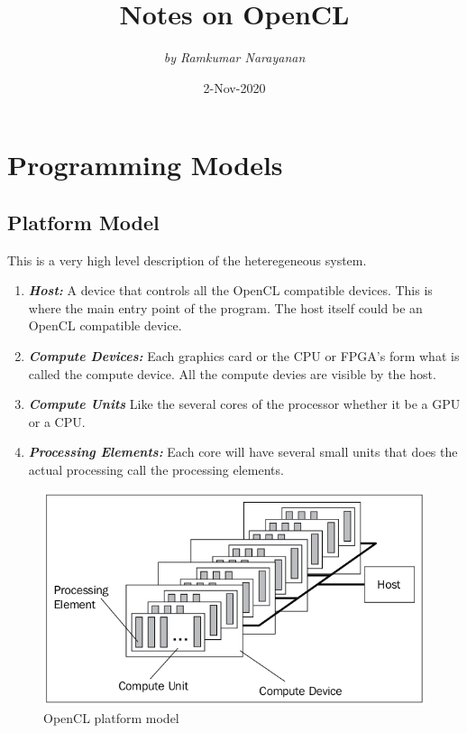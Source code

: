 \documentclass[10pt]{article}
\begin{document}
 
\title{\Huge \bsifamily Notes on OpenCL}
\author{\textit{by Ramkumar Narayanan}}
\date{}
\maketitle 
\tableofcontents
\newpage

{\color{red} \date{2-Nov-2020}}
\section{Programming Models}
\subsection{Platform Model}
This is a very high level description of the heteregeneous system. 
\begin{enumerate}
	\item \textbf{\textit{Host:}} A device that controls all the OpenCL compatible devices. This is where the main entry point of the program. The host itself could be an OpenCL compatible device.
	\item \textbf{\textit{Compute Devices:}} Each graphics card or the CPU or FPGA's form what is called the compute device. All the compute devies are visible by the host.
	\item \textbf{\textit{Compute Units}} Like the several cores of the processor whether it be a GPU or a CPU. 
	\item \textbf{\textit{Processing Elements:}} Each core will have several small units that does the actual processing call the processing elements.
\end{enumerate}

\begin{figure}[ht]
  \centering
  \includegraphics[scale=0.4]{./images/platform_model.png}
  \caption{OpenCL platform model}
  \label{platform_model}
\end{figure}
\end{document}
